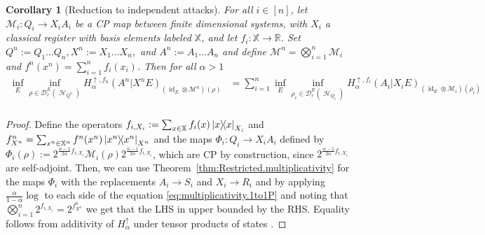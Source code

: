 \documentclass[11pt]{article}
\DeclareMathOperator{\id}{id}
\newcommand{\1}{\ensuremath{\mathbbm{1}}}
\theoremstyle{newdefinition}
\theoremstyle{newplain}
\newtheorem{corollary}[definition]{Corollary}
\theoremstyle{myplain}
\DeclareMathOperator{\cH}{\mathcal{H}}
\begin{document}
\begin{corollary}[Reduction to independent attacks]
    \label{thm:IIDreduction}
    For all $i\in [n]$, let $\mathcal M_i:Q_i\to X_iA_i$ be a CP map between finite dimensional systems, with $X_i$ a classical register with basis elements labeled $\mathbb{X}$, and let $f_i : \mathbb{X} \to \mathbb{R}$. Set $Q^n:=Q_1...Q_n, X^n:=X_1...X_n,$ and $A^n:=A_1...A_n$ and define $\mathcal M^n = \bigotimes_{i=1}^n \mathcal M_i$ and  $f^n(x^n) = \sum_{i=1}^n f_i(x_i)$. Then for all $\alpha>1$
    \begin{align}
        \inf_E\inf_{\rho\in \mathcal{D}^E_r(\cH_{Q^n})} H_\alpha^{\uparrow,f_n}(A^n|X^nE)_{(\id_E\otimes \mathcal M^n)(\rho)} 
            &= \sum_{i=1}^n \inf_E\inf_{\rho_i\in \mathcal{D}_r^E(\cH_{Q_i})} H_\alpha^{\uparrow,f_i}(A_i|X_iE)_{(\id_E\otimes\mathcal M_i)(\rho_i)} \\ 
    \end{align} %
\end{corollary}
\begin{proof}
Define the operators $f_{i,X_i} := \sum_{x \in \mathbb{X}} f_i(x) \ketbra{x}_{X_i}$ and $f^n_{X^n} = \sum_{x^n\in \mathbb{X}^n} f^n(x^n)\ketbra{x^n}_{X^n}$ and the maps $\Phi_i : Q_i \to X_i A_i $ defined by $\Phi_i(\rho) := 2^{\tfrac{\alpha-1}{2\alpha}f_{i,X_i}} \mathcal{M}_i(\rho) 2^{\tfrac{\alpha-1}{2\alpha}f_{i,X_i}}$, which are CP by construction, since $2^{\frac{\alpha-1}{2\alpha}f_{i,X_i}}$ are self-adjoint. Then, we can use Theorem~\ref{thm:Restricted.multiplicativity} for the maps $\Phi_i$ with the replacements $A_i \to S_i$ and $X_i \to R_i$  and by applying $\frac{\alpha}{1-\alpha}\log$ to each side of the equation \eqref{eq:multiplicativity.1to1P} and noting that $\bigotimes_{i=1}^n 2^{f_{i,X_i}} = 2^{f^n_{X^n}}$ we get that the LHS in upper bounded by the RHS.
Equality follows from additivity of $H^\uparrow_\alpha$ under tensor products of states \cite[Corollary 5.9]{Book.Tomamichel.2016}.
\end{proof}
\end{document}
